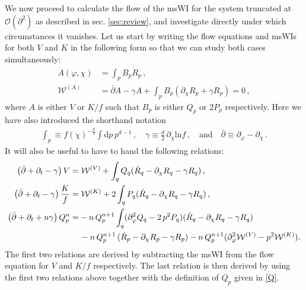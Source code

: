 \documentclass[11pt,draft]{book} %
\begin{document}
We now proceed to calculate the flow of the msWI for the system truncated
at $\mathcal{O}(\partial^2)$ as described in sec. \ref{sec:review},
and investigate directly under which circumstances it vanishes.
Let us start by writing the flow equations and msWIs for both $V$ and $K$ in the following form
so that we can study both cases simultaneously:
\begin{align}
	\label{flowA}
	\dot A(\varphi,\chi) &= \int_p B_p\dot R_p \,,\\
	\label{msWIA}
	\mathcal{W}^{(A)}&=\bar\partial A - \gamma A + \int_p B_p(\partial_\chi R_p + \gamma R_p)=0 \,,
\end{align}
where $A$ is either $V$ or $K/f$ such that $B_p$ is either $Q_p$ or $2 P_p$ respectively.
Here we have also introduced the shorthand notation
\begin{align}
  \label{gamma}
  \int_p \equiv f(\chi)^{-\frac{d}{2}} \int \mathrm dp \,p^{d-1} \,,
  \quad \gamma \equiv \frac{d}{2} \, \partial_\chi \mathrm{ln} f \,,
  \quad \text{and} \quad \bar\partial \equiv \partial_\varphi - \partial_\chi\,.
\end{align}
It will also be useful to have to hand the following relations:
\begin{align}
	\label{DV}
	\left( \bar \partial + \partial_t - \gamma \right) V &=
	\mathcal W^{(V)} + \int_q Q_q (\dot R_q - \partial_{\chi} R_q - \gamma R_q)\,,\\
	\label{DK}
	\left( \bar \partial + \partial_t - \gamma \right) \frac{K}{f} &=
	\mathcal W^{(K)} + 2 \int_q P_q (\dot R_q - \partial_{\chi} R_q - \gamma R_q)\,,\\
	\label{DQ}
	\left( \bar \partial + \partial_t + n \gamma \right) Q_p^n &=
	- \, n \, Q_p^{n+1} \int_q (\partial_{\varphi}^2 Q_q - 2 \, p^2 P_q)(\dot R_q - \partial_{\chi} R_q
	 - \gamma R_q)\nonumber\\
   &\hspace{4.2mm}-n \, Q_p^{n+1} \, (\dot R_p - \partial_{\chi} R_p - \gamma R_p)
	-n \, Q_p^{n+1} (\partial_{\varphi}^2 \mathcal W^{(V)} - p^2 \mathcal W^{(K)}).
\end{align}
The first two relations are derived by subtracting the msWI from the flow equation for
$V$ and $K/f$ respectively. The last relation is then derived by using the first two relations
above together with the definition of $Q_p$ given in \eqref{Q}.
\end{document}
